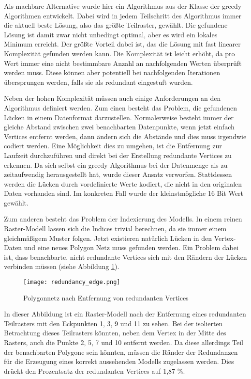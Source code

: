 Als machbare Alternative wurde hier ein Algorithmus aus der Klasse der greedy Algorithmen entwickelt. Dabei wird in jedem Teilschritt des Algorithmus immer die aktuell beste Lösung, also das größte Teilraster, gewählt. Die gefundene Lösung ist damit zwar nicht unbedingt optimal, aber es wird ein lokales Minimum erreicht. Der größte Vorteil dabei ist, das die Lösung mit fast linearer Komplexität gefunden werden kann. Die Komplexität ist leicht erhöht, da pro Wert immer eine nicht bestimmbare Anzahl an nachfolgenden Werten überprüft werden muss. Diese können aber potentiell bei nachfolgenden Iterationen übersprungen werden, falls sie als redundant eingestuft wurden.

Neben der hohen Komplexität müssen auch einige Anforderungen an den Algorithmus definiert werden. Zum einen besteht das Problem, die gefundenen Lücken in einem Datenformat darzustellen. Normalerweise besteht immer der gleiche Abstand zwischen zwei benachbarten Datenpunkte, wenn jetzt einfach Vertices entfernt werden, dann ändern sich die Abstände und dies muss irgendwie codiert werden. Eine Möglichkeit dies zu umgehen, ist die Entfernung zur Laufzeit durchzuführen und direkt bei der Erstellung redundante Vertices zu erkennen. Da sich selbst ein greedy Algorithmus bei der Datenmenge als zu zeitaufwendig herausgestellt hat, wurde dieser Ansatz verworfen. Stattdessen werden die Lücken durch vordefinierte Werte kodiert, die nicht in den originalen Daten vorhanden sind. Im konkreten Fall wurde der kleinstmögliche 16 Bit Wert gewählt. 

Zum anderen besteht das Problem der Indexierung des Modells. In einem reinen Raster-Modell lassen sich die Indices trivial berechnen, da sie immer einem gleichmäßigem Muster folgen. Jetzt existieren natürlich Lücken in den Vertex-Daten und eine neues Polygon Netz muss gefunden werden. Ein Problem dabei ist, dass benachbarte, nicht redundante Vertices sich mit den Rändern der Lücken verbinden müssen (siehe Abbildung \ref{redundancy_edge}).

\begin{figure}[H]
    \texttt{[image: redundancy\_edge.png]}
    \caption{Polygonnetz nach Entfernung von redundanten Vertices}
    \label{redundancy_edge}
\end{figure}

In dieser Abbildung ist ein Raster-Modell nach der Entfernung eines redundanten Teilrasters mit den Eckpunkten 1, 3, 9 und 11 zu sehen. Bei der isolierten Betrachtung dieses Teilrasters könnten, neben dem Vertex in der Mitte des Rasters, auch die Punkte 2, 5, 7 und 10 entfernt werden. Da diese allerdings Teil der benachbarten Polygone sein könnten, müssen die Ränder der Redundanzen für die Erzeugung eines korrekt aussehenden Modells zugelassen werden. Dies drückt den Prozentsatz der redundanten Vertices auf 1,87 \%.

